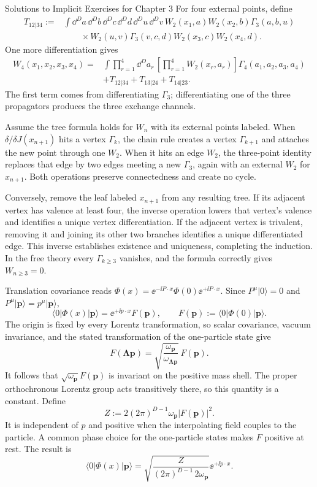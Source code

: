\begin{bankssolutions}{Solutions to Implicit Exercises for Chapter 3}
For four external points, define
\begin{align*}
 T_{12|34}:={}&\int\dd^D a\,\dd^D b\,\dd^D c\,\dd^D d\,
                 \dd^D u\,\dd^D v\,
 W_2(x_1,a)W_2(x_2,b)\Gamma_3(a,b,u)\\
 &\qquad\times W_2(u,v)\Gamma_3(v,c,d)
 W_2(x_3,c)W_2(x_4,d).
\end{align*}
One more differentiation gives
\begin{align*}
 W_4(x_1,x_2,x_3,x_4)
 ={}&\int\prod_{r=1}^4\dd^D a_r\,
 \left[\prod_{r=1}^4W_2(x_r,a_r)\right]
 \Gamma_4(a_1,a_2,a_3,a_4)\\
 &+T_{12|34}+T_{13|24}+T_{14|23}.
\end{align*}
The first term comes from differentiating $\Gamma_3$; differentiating one of
the three propagators produces the three exchange channels.

Assume the tree formula holds for $W_n$ with its external points labeled.
When $\delta/\delta J(x_{n+1})$ hits a vertex $\Gamma_k$, the chain rule
creates a vertex $\Gamma_{k+1}$ and attaches the new point through one
$W_2$.  When it hits an edge $W_2$, the three-point identity replaces that
edge by two edges meeting a new $\Gamma_3$, again with an external $W_2$ for
$x_{n+1}$.  Both operations preserve connectedness and create no cycle.

Conversely, remove the leaf labeled $x_{n+1}$ from any resulting tree.  If
its adjacent vertex has valence at least four, the inverse operation lowers
that vertex's valence and identifies a unique vertex differentiation.  If the
adjacent vertex is trivalent, removing it and joining its other two branches
identifies a unique differentiated edge.  This inverse establishes existence
and uniqueness, completing the induction.  In the free theory every
$\Gamma_{k\geq3}$ vanishes, and the formula correctly gives
$W_{n\geq3}=0$.

Translation covariance reads
\(\Phi(x)=\ee^{-\ii P\mathbin{\cdot}x}\Phi(0)\ee^{+\ii P\mathbin{\cdot}x}\).  Since
$P^\mu|0\rangle=0$ and $P^\mu|\mathbf p\rangle=p^\mu|\mathbf p\rangle$,
\[
 \langle0|\Phi(x)|\mathbf p\rangle
 =\ee^{+\ii p\mathbin{\cdot}x}F(\mathbf p),
 \qquad F(\mathbf p):=\langle0|\Phi(0)|\mathbf p\rangle.
\]
The origin is fixed by every Lorentz transformation, so scalar covariance,
vacuum invariance, and the stated transformation of the one-particle state
give
\[
 F(\boldsymbol{\Lambda p})
 =\sqrt{\frac{\omega_{\mathbf p}}{\omega_{\boldsymbol{\Lambda p}}}}\,F(\mathbf p).
\]
It follows that $\sqrt{\omega_{\mathbf p}}F(\mathbf p)$ is invariant on the positive
mass shell.  The proper orthochronous Lorentz group acts transitively there,
so this quantity is a constant.  Define
\[
 Z:=2(2\pi)^{D-1}\omega_{\mathbf p}|F(\mathbf p)|^2.
\]
It is independent of $p$ and positive when the interpolating field couples to
the particle.  A common phase choice for the one-particle states makes $F$
positive at rest.  The result is
\[
 \boxed{\langle0|\Phi(x)|\mathbf p\rangle
 =\sqrt{\frac{Z}{(2\pi)^{D-1}\,2\omega_{\mathbf p}}}\ee^{+\ii p\mathbin{\cdot}x}}.
\]


\end{bankssolutions}

